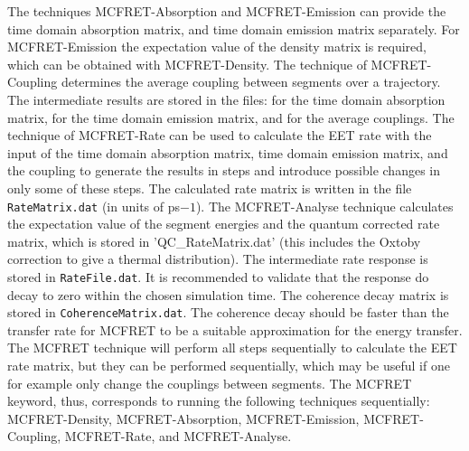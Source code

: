 The techniques MCFRET-Absorption and MCFRET-Emission can provide the time domain absorption matrix, and time domain emission matrix separately.
For MCFRET-Emission the expectation value of the density matrix is required, which can be obtained with MCFRET-Density.
The technique of MCFRET-Coupling determines the average coupling between segments over a trajectory. The intermediate results are stored in the files:
  for the time domain absorption matrix,  for the time domain emission matrix, and   for the average couplings. 
The technique of MCFRET-Rate can be used to calculate the EET rate with the input of the time domain absorption matrix, time domain emission matrix, and the coupling to generate the results in steps and introduce possible changes in only some of these steps.  The calculated rate matrix is written in the file {\tt RateMatrix.dat} (in units of ps${-1}$). The MCFRET-Analyse technique calculates the expectation value of the segment energies and the quantum corrected rate matrix, which is stored in 'QC\_RateMatrix.dat' (this includes the Oxtoby correction to give a thermal distribution). The intermediate  rate response is stored in {\tt RateFile.dat}. It is recommended to validate that the response do decay to zero within the chosen simulation time. The coherence decay matrix is stored in {\tt CoherenceMatrix.dat}. The coherence decay should be faster than the transfer rate for MCFRET to be a suitable approximation for the energy transfer.
The MCFRET technique will perform all steps sequentially to calculate the EET rate matrix, but they can be performed sequentially, which may be useful if one for example only change the couplings between segments. 
The MCFRET keyword, thus, corresponds to running the following techniques sequentially: MCFRET-Density, MCFRET-Absorption, MCFRET-Emission, MCFRET-Coupling, MCFRET-Rate, and MCFRET-Analyse.

